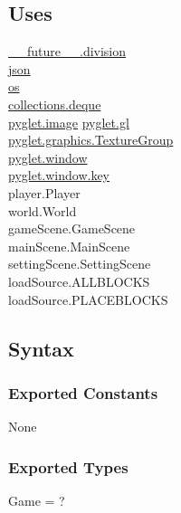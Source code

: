 \documentclass{article}
\begin{document}
\subsection {Uses}
\href{https://docs.python.org/3/library/__future__.html?highlight=division}{\_\_future\_\_.division}\\
\href{https://docs.python.org/3/library/json.html}{json}\\
\href{https://docs.python.org/3/library/os.html}{os} \\
\href{https://docs.python.org/3/library/collections.html?highlight=deque#collections.deque}{collections.deque} \\
\href{https://pyglet.readthedocs.io/en/latest/modules/image/index.html}{pyglet.image} 
\href{https://pyglet.readthedocs.io/en/latest/modules/gl.html}{pyglet.gl}\\
\href{https://pyglet.readthedocs.io/en/latest/modules/graphics/#pyglet.graphics.TextureGroup}{pyglet.graphics.TextureGroup}\\
\href{https://pyglet.readthedocs.io/en/latest/modules/window.html}{pyglet.window}\\
\href{https://pyglet.readthedocs.io/en/latest/modules/window_key.html}{pyglet.window.key}\\
player.Player\\
world.World\\
gameScene.GameScene\\
mainScene.MainScene\\
settingScene.SettingScene\\
loadSource.ALLBLOCKS\\
loadSource.PLACEBLOCKS


\subsection {Syntax}

\subsubsection {Exported Constants}
None

\subsubsection {Exported Types}
Game = ?
\end{document}
